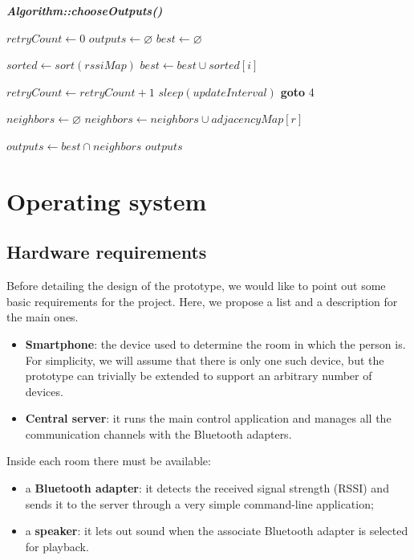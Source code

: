 \documentclass[conference]{IEEEtran}
\begin{document}
\vspace{2mm}
\textbf{\textit{Algorithm::chooseOutputs()}}
\begin{algorithmic}[1]
\STATE $retryCount \gets 0$
\STATE $outputs \gets \varnothing$
\STATE $best \gets \varnothing$

\STATE $sorted \gets sort(rssiMap)$
	\STATE $best \gets best \cup sorted[i]$
\ENDFOR

	\STATE $retryCount \gets retryCount + 1$
	\STATE $sleep(updateInterval)$
	\STATE \textbf{goto} 4
\ENDIF

\STATE $neighbors \gets \varnothing$
	\STATE $neighbors \gets neighbors \cup adjacencyMap[r]$
\ENDFOR

\STATE $outputs \gets best \cap neighbors$
\RETURN $outputs$
\end{algorithmic}

\section{Operating system} %

\subsection{Hardware requirements}
\label{hardware-requirements}
Before detailing the design of the prototype, we would like to point out some basic requirements for the project. Here, we propose a list and a description for the main ones.
\begin{itemize}
	\item{\textbf{Smartphone}:} the device used to determine the room in which the person is. For simplicity, we will assume that there is only one such device, but the prototype can trivially be extended to support an arbitrary number of devices.
	\item{\textbf{Central server}:} it runs the main control application and manages all the communication channels with the Bluetooth adapters.
\end{itemize}
Inside each room there must be available:
\begin{itemize}
	\item{a \textbf{Bluetooth adapter}:} it detects the received signal strength (RSSI) and sends it to the server through a very simple command-line application;
	\item{a \textbf{speaker}:} it lets out sound when the associate Bluetooth adapter is selected for playback.
\end{itemize}
\end{document}
